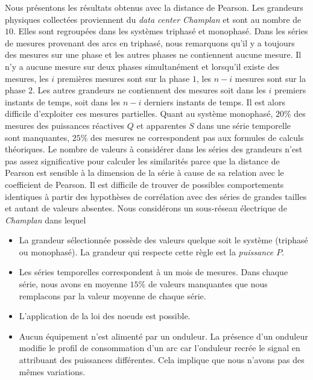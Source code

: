 Nous pr\'esentons les r\'esultats obtenus avec la distance de Pearson.
\newline
Les grandeurs physiques collect\'ees proviennent du {\em data center Champlan} et sont au nombre de $10$. Elles sont regroup\'ees dans les syst\`emes triphas\'e et monophas\'e.
Dans les s\'eries de mesures  provenant des arcs en triphas\'e, nous remarquons qu'il y a toujours des mesures sur une phase et les autres phases ne contiennent aucune mesure. Il n'y a aucune mesure sur deux phases simultan\'ement et lorsqu'il  existe des mesures, les $i$ premi\`eres mesures sont sur la phase $1$, les $n-i$ mesures sont sur la phase $2$. 
Les autres grandeurs ne contiennent des mesures 
soit dans les $i$ premiers instants de temps, 
soit dans les $n-i$ derniers instants de temps. 
Il est alors difficile d'exploiter ces mesures partielles.
Quant au syst\`eme monophas\'e, $20\%$ des mesures des puissances r\'eactives $Q$ et apparentes $S$ dans une s\'erie temporelle sont manquantes, $25\%$ des mesures ne correspondent pas aux formules de calculs th\'eoriques. 
Le nombre de valeurs \`a consid\'erer dans les s\'eries des grandeurs n'est pas assez significative pour calculer les similarit\'es parce que la distance de Pearson est sensible \`a la dimension de la s\'erie \`a cause de sa relation avec le coefficient de Pearson. Il est difficile de trouver de possibles comportements identiques \`a partir des hypoth\`eses de corr\'elation avec des s\'eries de grandes tailles et autant de valeurs absentes.
\newline
Nous consid\'erons un sous-r\'eseau \'electrique de {\em Champlan} dans lequel 
\begin{itemize}
	\item La grandeur s\'electionn\'ee poss\`ede des valeurs quelque soit le syst\`eme (triphas\'e ou monophas\'e). La grandeur qui respecte cette r\`egle est la {\em puissance $P$}.
	\item Les s\'eries temporelles correspondent \`a un mois de mesures. 
		Dans chaque s\'erie, nous avons en moyenne $15\%$ de valeurs manquantes que nous remplacons par la valeur moyenne de chaque s\'erie.
	\item L'application de la loi des noeuds est possible.
	\item Aucun \'equipement n'est aliment\'e par un onduleur. La pr\'esence d'un onduleur modifie le profil de consommation d'un arc car l'onduleur recr\'ee le signal en attribuant des puissances diff\'erentes. Cela implique que nous n'avons pas des m\^emes variations.
	 
\end{itemize}
